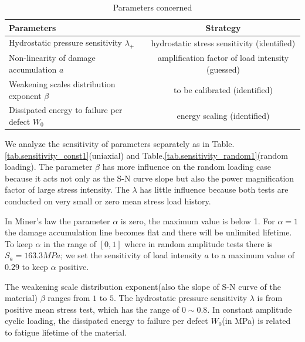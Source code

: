 \begin{table}[!h]
	\centering
	\begin{tabular}{l|c}
		\hline
		\textbf{Parameters}                                  & \multicolumn{1}{c}{\textbf{Strategy}} \\ \hline
		Hydrostatic pressure sensitivity $\lambda_+$           & hydrostatic stress sensitivity (identified)         \\
		Non-linearity of damage accumulation  $a$        & amplification factor of load intensity (guessed)     \\
		Weakening scales distribution exponent  $\beta$      & to be calibrated (identified)                   \\
		Dissipated energy to failure per defect  $W_0$ & energy scaling (identified)              \\ \hline
	\end{tabular}
	\caption{Parameters concerned}
	\label{paras}
\end{table}

We analyze the sensitivity of parameters separately as in Table.\ref{tab.sensitivity_const1}(uniaxial) and Table.\ref{tab.sensitivity_random1}(random loading). The parameter $\beta$ has more influence on the random loading case because it acts not only as the S-N curve slope but also the power magnification factor of large stress intensity. The $\lambda$ has little influence because both tests are conducted on very small or zero mean stress load history.


In Miner's law the parameter $\alpha$ is zero, the maximum value is below 1. For $\alpha=1$ the damage accumulation line becomes flat and there will be unlimited lifetime. To keep $\alpha$ in the range of $[0,1]$ where in random amplitude tests there is $S_{a}=163.3MPa$; we set the sensitivity of load intensity  $a$  to a maximum value of $0.29$ to keep $\alpha$ positive. 

The weakening scale distribution exponent(also the slope of S-N curve of the material) $\beta$ ranges from $1$ to $5$. The hydrostatic pressure sensitivity $\lambda$ is from positive mean stress test, which has the range of $0\sim0.8$. In constant amplitude cyclic loading, the dissipated energy to failure per defect $W_0$(in MPa) is related to fatigue lifetime of the material.

